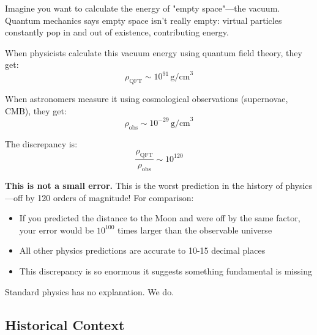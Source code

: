 \begin{intuitive}
Imagine you want to calculate the energy of "empty space"—the vacuum. Quantum mechanics says empty space isn't really empty: virtual particles constantly pop in and out of existence, contributing energy.

When physicists calculate this vacuum energy using quantum field theory, they get:
\begin{equation}
\rho_{\text{QFT}} \sim 10^{91} \, \text{g/cm}^3
\end{equation}

When astronomers measure it using cosmological observations (supernovae, CMB), they get:
\begin{equation}
\rho_{\text{obs}} \sim 10^{-29} \, \text{g/cm}^3
\end{equation}

The discrepancy is:
\begin{equation}
\frac{\rho_{\text{QFT}}}{\rho_{\text{obs}}} \sim 10^{120}
\end{equation}

\textbf{This is not a small error.} This is the worst prediction in the history of physics—off by 120 orders of magnitude! For comparison:
\begin{itemize}
\item If you predicted the distance to the Moon and were off by the same factor, your error would be $10^{100}$ times larger than the observable universe
\item All other physics predictions are accurate to 10-15 decimal places
\item This discrepancy is so enormous it suggests something fundamental is missing
\end{itemize}

Standard physics has no explanation. We do.
\end{intuitive}

\subsection{Historical Context}

